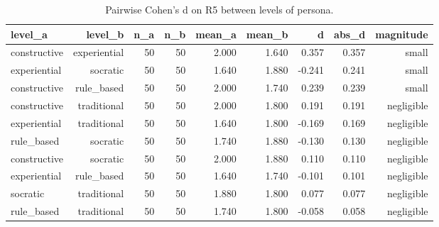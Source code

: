 \begin{table}[htbp]
\centering
\caption{Pairwise Cohen's d on R5 between levels of persona.}
\label{tab:cohensd-persona-R5}
\begin{tabular}{lrrrrrrrr}
\toprule
level\_a & level\_b & n\_a & n\_b & mean\_a & mean\_b & d & abs\_d & magnitude \\
\midrule
constructive & experiential & 50 & 50 & 2.000 & 1.640 & 0.357 & 0.357 & small \\
experiential & socratic & 50 & 50 & 1.640 & 1.880 & -0.241 & 0.241 & small \\
constructive & rule\_based & 50 & 50 & 2.000 & 1.740 & 0.239 & 0.239 & small \\
constructive & traditional & 50 & 50 & 2.000 & 1.800 & 0.191 & 0.191 & negligible \\
experiential & traditional & 50 & 50 & 1.640 & 1.800 & -0.169 & 0.169 & negligible \\
rule\_based & socratic & 50 & 50 & 1.740 & 1.880 & -0.130 & 0.130 & negligible \\
constructive & socratic & 50 & 50 & 2.000 & 1.880 & 0.110 & 0.110 & negligible \\
experiential & rule\_based & 50 & 50 & 1.640 & 1.740 & -0.101 & 0.101 & negligible \\
socratic & traditional & 50 & 50 & 1.880 & 1.800 & 0.077 & 0.077 & negligible \\
rule\_based & traditional & 50 & 50 & 1.740 & 1.800 & -0.058 & 0.058 & negligible \\
\bottomrule
\end{tabular}
\end{table}
